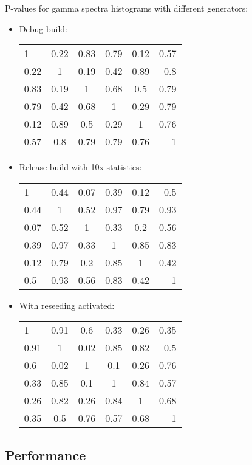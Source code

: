\documentclass[a4paper, 12pt]{article} %
\begin{document}
    P-values for gamma spectra histograms with different generators:
    \begin{itemize}
     \item Debug build:\\      
      \begin{tabular}{ l c c c c r }
       1 & 0.22 & 0.83 & 0.79 & 0.12 & 0.57 \\
       0.22 & 1 & 0.19 & 0.42 & 0.89 & 0.8 \\
       0.83 & 0.19 & 1 & 0.68 & 0.5 & 0.79 \\
       0.79 & 0.42 & 0.68 & 1 & 0.29 & 0.79 \\
       0.12 & 0.89 & 0.5 & 0.29 & 1 & 0.76 \\
       0.57 & 0.8 & 0.79 & 0.79 & 0.76 & 1 \\
      \end{tabular}
     
      \item Release build with 10x statistics:\\
       \begin{tabular}{ l c c c c r }
	1 & 0.44 & 0.07 & 0.39 & 0.12 & 0.5 \\
	0.44 & 1 & 0.52 & 0.97 & 0.79 & 0.93 \\
	0.07 & 0.52 & 1 & 0.33 & 0.2 & 0.56 \\
	0.39 & 0.97 & 0.33 & 1 & 0.85 & 0.83 \\
	0.12 & 0.79 & 0.2 & 0.85 & 1 & 0.42 \\
	0.5 & 0.93 & 0.56 & 0.83 & 0.42 & 1 \\
       \end{tabular}
      
      \item With reseeding activated:\\
       \begin{tabular}{ l c c c c r }
	1 & 0.91 & 0.6 & 0.33 & 0.26 & 0.35 \\
	0.91 & 1 & 0.02 & 0.85 & 0.82 & 0.5 \\
	0.6 & 0.02 & 1 & 0.1 & 0.26 & 0.76 \\
	0.33 & 0.85 & 0.1 & 1 & 0.84 & 0.57 \\
	0.26 & 0.82 & 0.26 & 0.84 & 1 & 0.68 \\
	0.35 & 0.5 & 0.76 & 0.57 & 0.68 & 1 \\
       \end{tabular}
    \end{itemize}
   \subsection{Performance}
    
    \scalebox{.8}{}
    \scalebox{.8}{}
    \scalebox{.8}{}
    \scalebox{.8}{}
    \scalebox{.8}{}
    \scalebox{.8}{}
    
\end{document}
